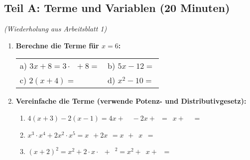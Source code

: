 \subsection*{Teil A: Terme und Variablen (20 Minuten)}
\textit{(Wiederholung aus Arbeitsblatt 1)}

\begin{enumerate}[label=\arabic*.]

    \item \textbf{Berechne die Terme für $x = 6$:}

    \vspace{0.5cm}

    \begin{tabular}{ll}
        a) $3x + 8 = 3 \cdot \phantom{0} + 8 = $ \underline{\hspace{2cm}} & b) $5x - 12 = $ \underline{\hspace{3cm}} \\[3ex]
        c) $2(x + 4) = $ \underline{\hspace{3cm}} & d) $x^2 - 10 = $ \underline{\hspace{3cm}}
    \end{tabular}

    \vspace{1cm}

    \item \textbf{Vereinfache die Terme (verwende Potenz- und Distributivgesetz):}

    \vspace{0.5cm}

    \begin{enumerate}[label=\alph*)]
        \item $4(x + 3) - 2(x - 1) = 4x + \phantom{00} - 2x + \phantom{0} = \phantom{0}x + \phantom{00}$ = \underline{\hspace{3cm}}

        \vspace{0.5cm}

        \item $x^3 \cdot x^4 + 2x^2 \cdot x^5 = x^{\phantom{0}} + 2x^{\phantom{0}} = x^{\phantom{0}} + \phantom{0}x^{\phantom{0}}$ = \underline{\hspace{3cm}}

        \vspace{0.5cm}

        \item $(x + 2)^2 = x^2 + 2 \cdot x \cdot \phantom{0} + \phantom{0}^2 = x^2 + \phantom{0}x + \phantom{0}$ = \underline{\hspace{3cm}}


\end{enumerate}
\end{enumerate}
